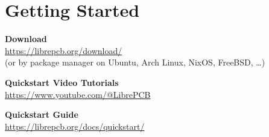 \section{Getting Started}

\begin{frame}{\secname}
  \begin{center}
    \bigskip \bigskip
    \large\textbf{Download}\\
    \url{https://librepcb.org/download/}\\
    \small{(or by package manager on Ubuntu, Arch Linux, NixOS, FreeBSD, \ldots)}

    \bigskip \bigskip
    \large\textbf{Quickstart Video Tutorials}\\
    \url{https://www.youtube.com/@LibrePCB}

    \bigskip \bigskip
    \large\textbf{Quickstart Guide}\\
    \url{https://librepcb.org/docs/quickstart/}
  \end{center}
\end{frame}
